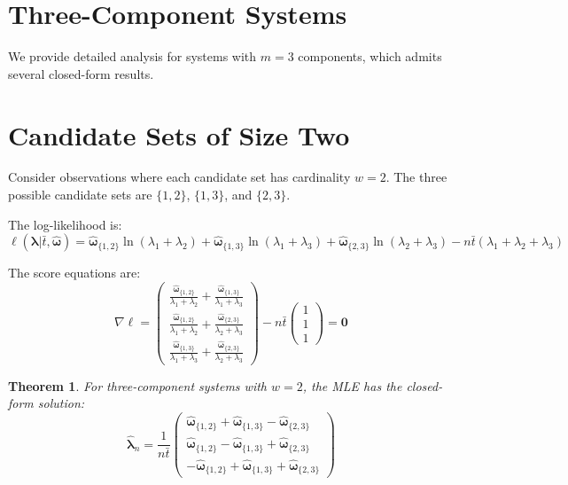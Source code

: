 \documentclass[12pt]{article}
\newcommand{\expomle}{\boldsymbol{\hat{\lambda}}_n}
\newcommand{\cntsymb}{\boldsymbol{\hat\omega}}
\newcommand{\cnt}[1]{\cntsymb_{\{#1\}}}
\renewcommand{\vec}[1]{\boldsymbol{#1}}
\newtheorem{theorem}{Theorem}[section]
\theoremstyle{definition}
\begin{document}
\section{Three-Component Systems}
\label{sec:three_component}

We provide detailed analysis for systems with $m=3$ components, which admits several closed-form results.

\section{Candidate Sets of Size Two}

Consider observations where each candidate set has cardinality $w=2$. The three possible candidate sets are $\{1,2\}$, $\{1,3\}$, and $\{2,3\}$.

The log-likelihood is:
\begin{equation}
\ell(\vec{\lambda} | \bar{t}, \cntsymb) = \cnt{1,2} \ln(\lambda_1 + \lambda_2) + \cnt{1,3} \ln(\lambda_1 + \lambda_3) + \cnt{2,3} \ln(\lambda_2 + \lambda_3) - n\bar{t}(\lambda_1 + \lambda_2 + \lambda_3)
\end{equation}

The score equations are:
\begin{equation}
\nabla \ell = \begin{pmatrix}
\frac{\cnt{1,2}}{\lambda_1 + \lambda_2} + \frac{\cnt{1,3}}{\lambda_1 + \lambda_3}\\
\frac{\cnt{1,2}}{\lambda_1 + \lambda_2} + \frac{\cnt{2,3}}{\lambda_2 + \lambda_3}\\
\frac{\cnt{1,3}}{\lambda_1 + \lambda_3} + \frac{\cnt{2,3}}{\lambda_2 + \lambda_3}
\end{pmatrix} - n\bar{t} \begin{pmatrix} 1\\1\\1 \end{pmatrix} = \vec{0}
\end{equation}

\begin{theorem}
For three-component systems with $w=2$, the MLE has the closed-form solution:
\begin{equation}
\label{eq:expo_mle_3comp_w2}
\expomle = \frac{1}{n\bar{t}} \begin{pmatrix}
\cnt{1,2} + \cnt{1,3} - \cnt{2,3}\\
\cnt{1,2} - \cnt{1,3} + \cnt{2,3}\\
-\cnt{1,2} + \cnt{1,3} + \cnt{2,3}
\end{pmatrix}
\end{equation}
\end{theorem}
\end{document}
